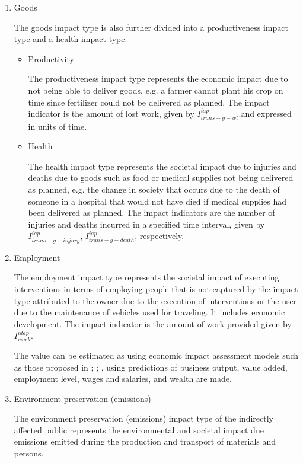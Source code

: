 \begin{enumerate}
\item Goods

The goods impact type is also further divided into a productiveness impact type and a health impact type. 

\begin{itemize}
\item Productivity

The productiveness impact type represents the economic impact due to not being able to deliver goods, e.g. a farmer cannot plant his crop on time since fertilizer could not be delivered as planned. The impact indicator is the amount of lost work, given by $I_{trans - g - wt}^{iap}$.and expressed in units of time.

\item Health

The health impact type represents the societal impact due to injuries and deaths due to goods such as food or medical supplies not being delivered as planned, e.g. the change in society that occurs due to the death of someone in a hospital that would not have died if medical supplies had been delivered as planned. The impact indicators are the number of injuries and deaths incurred in a specified time interval, given by$I_{trans - g - injury}^{iap}$, $I_{trans - g - death}^{iap}$, respectively.
\end{itemize}

\item Employment

The employment impact type represents the societal impact of executing interventions in terms of employing people that is not captured by the impact type attributed to the owner due to the execution of interventions or the user due to the maintenance of vehicles used for traveling. It includes economic development. The impact indicator is the amount of work provided given by $I_{work}^{idap}$. 

The value can be estimated as using economic impact assessment models such as those proposed in \cite{cubrc2001}; \cite{Davis2001}; \cite{Kumares2007}, using predictions of business output, value added, employment level, wages and salaries, and wealth are made.

\item Environment preservation (emissions)

The environment preservation (emissions) impact type of the indirectly affected public represents the environmental and societal impact due emissions emitted during the production and transport of materials and persons. 


\end{enumerate}

